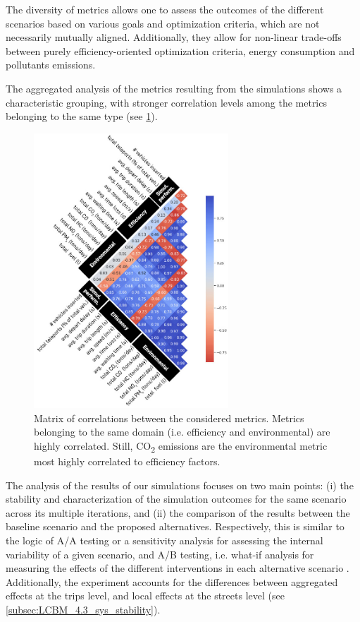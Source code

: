 \setlength{\parindent}{1em}

The diversity of metrics allows one to assess the outcomes of the different scenarios based on various goals and optimization criteria, which are not necessarily mutually aligned. Additionally, they allow for non-linear trade-offs between purely efficiency-oriented optimization criteria, energy consumption and pollutants emissions.

The aggregated analysis of the metrics resulting from the simulations shows a characteristic grouping, with stronger correlation levels among the metrics belonging to the same type (see \cref{fig:LCBM_fig08}).

\begin{figure}[htbp!]
    \centering
    \includegraphics[width=0.65\textwidth]{LCBM_fig08.jpg}
    \caption{Matrix of correlations between the considered metrics. Metrics belonging to the same domain (i.e. efficiency and environmental) are highly correlated. Still, CO\textsubscript{2} emissions are the environmental metric most highly correlated to efficiency factors.}
   \label{fig:LCBM_fig08}
\end{figure}

The analysis of the results of our simulations focuses on two main points: (i) the stability and characterization of the simulation outcomes for the same scenario across its multiple iterations, and (ii) the comparison of the results between the baseline scenario and the proposed alternatives. Respectively, this is similar to the logic of A/A testing or a sensitivity analysis for assessing the internal variability of a given scenario, and A/B testing, i.e. what-if analysis for measuring the effects of the different interventions in each alternative scenario \citep{Rizzi2009,Kohavi2017,Fu2020,Carlino2022}.  Additionally, the experiment accounts for the differences between aggregated effects at the trips level, and local effects at the streets level (see \cref{subsec:LCBM_4.3_sys_stability}).

